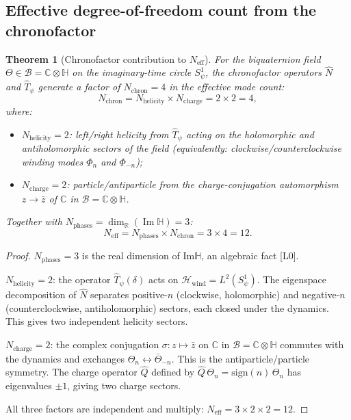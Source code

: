 \documentclass[12pt,a4paper]{article}
\newtheorem{theorem}{Theorem}[section]
\theoremstyle{definition}
\theoremstyle{remark}
\begin{document}
\subsection{Effective degree-of-freedom count from the chronofactor}

\begin{theorem}[Chronofactor contribution to $N_{\mathrm{eff}}$]
\label{thm:chron:Neff}
For the biquaternion field $\Theta \in \mathcal{B} = \mathbb{C}\otimes\mathbb{H}$
on the imaginary-time circle $S^1_\psi$, the chronofactor operators $\hat{N}$ and
$\hat{T}_\psi$ generate a factor of $N_{\mathrm{chron}} = 4$ in the effective
mode count:
\begin{equation}
  N_{\mathrm{chron}}
  = N_{\mathrm{helicity}} \times N_{\mathrm{charge}}
  = 2 \times 2
  = 4,
  \label{eq:chron:Nchron}
\end{equation}
where:
\begin{itemize}
  \item $N_{\mathrm{helicity}} = 2$: left/right helicity from $\hat{T}_\psi$ acting on
        the holomorphic and antiholomorphic sectors of the field (equivalently:
        clockwise/counterclockwise winding modes $\Phi_n$ and $\Phi_{-n}$);
  \item $N_{\mathrm{charge}} = 2$: particle/antiparticle from the charge-conjugation
        automorphism $z \to \bar{z}$ of $\mathbb{C}$ in $\mathcal{B}=\mathbb{C}\otimes\mathbb{H}$.
\end{itemize}
Together with $N_{\mathrm{phases}} = \dim_\mathbb{R}(\operatorname{Im}\mathbb{H}) = 3$:
\begin{equation}
  N_{\mathrm{eff}}
  = N_{\mathrm{phases}} \times N_{\mathrm{chron}}
  = 3 \times 4
  = 12.
  \label{eq:chron:Neff12}
\end{equation}
\end{theorem}

\begin{proof}
$N_{\mathrm{phases}} = 3$ is the real dimension of Im$\mathbb{H}$, an
algebraic fact [L0].

$N_{\mathrm{helicity}} = 2$: the operator $\hat{T}_\psi(\delta)$ acts on
$\mathcal{H}_{\mathrm{wind}} = L^2(S^1_\psi)$.  The eigenspace decomposition of
$\hat{N}$ separates positive-$n$ (clockwise, holomorphic) and negative-$n$
(counterclockwise, antiholomorphic) sectors, each closed under the dynamics.
This gives two independent helicity sectors.

$N_{\mathrm{charge}} = 2$: the complex conjugation $\sigma: z\mapsto\bar{z}$ on
$\mathbb{C}$ in $\mathcal{B}=\mathbb{C}\otimes\mathbb{H}$ commutes with the dynamics
and exchanges $\Theta_n \leftrightarrow \bar\Theta_{-n}$.  This is the
antiparticle/particle symmetry.  The charge operator $\hat{Q}$ defined by
$\hat{Q}\,\Theta_n = \mathrm{sign}(n)\,\Theta_n$ has eigenvalues $\pm1$,
giving two charge sectors.

All three factors are independent and multiply: $N_{\mathrm{eff}} = 3 \times 2 \times 2 = 12$.
\end{proof}
\end{document}
